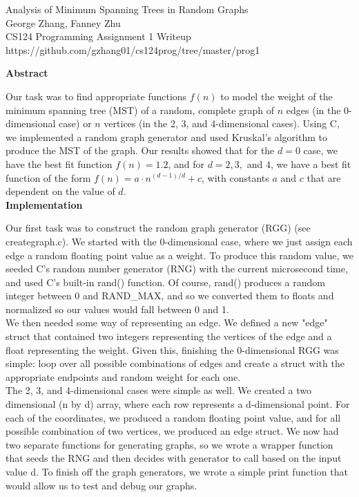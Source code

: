 \documentclass[12pt]{article}
\begin{document}
\begin{center}
Analysis of Minimum Spanning Trees in Random Graphs \\
George Zhang, Fanney Zhu \\
CS124 Programming Assignment 1 Writeup \\
https://github.com/gzhang01/cs124prog/tree/master/prog1 \\
\end{center}

\bigskip

\textbf{Abstract}

Our task was to find appropriate functions $f(n)$ to model the weight of the minimum spanning tree (MST) of a random, complete graph of $n$ edges (in the 0-dimensional case) or $n$ vertices (in the 2, 3, and 4-dimensional cases). Using C, we implemented a random graph generator and used Kruskal's algorithm to produce the MST of the graph. Our results showed that for the $d = 0$ case, we have the best fit function $f(n) = 1.2$, and for $d = 2, 3,$ and $4$, we have a best fit function of the form $f(n) = a\cdot n^{(d - 1)/d} + c$, with constants $a$ and $c$ that are dependent on the value of $d$.  \\

\textbf{Implementation}

Our first task was to construct the random graph generator (RGG) (see creategraph.c). We started with the 0-dimensional case, where we just assign each edge a random floating point value as a weight. To produce this random value, we seeded C's random number generator (RNG) with the current microsecond time, and used C's built-in rand() function. Of course, rand() produces a random integer between 0 and RAND\_MAX, and so we converted them to floats and normalized so our values would fall between 0 and 1. \\

We then needed some way of representing an edge. We defined a new "edge" struct that contained two integers representing the vertices of the edge and a float representing the weight. Given this, finishing the 0-dimensional RGG was simple: loop over all possible combinations of edges and create a struct with the appropriate endpoints and random weight for each one. \\

The 2, 3, and 4-dimensional cases were simple as well. We created a two dimensional (n by d) array, where each row represents a d-dimensional point. For each of the coordinates, we produced a random floating point value, and for all possible combination of two vertices, we produced an edge struct. We now had two separate functions for generating graphs, so we wrote a wrapper function that seeds the RNG and then decides with generator to call based on the input value d. To finish off the graph generators, we wrote a simple print function that would allow us to test and debug our graphs. \\
\end{document}
